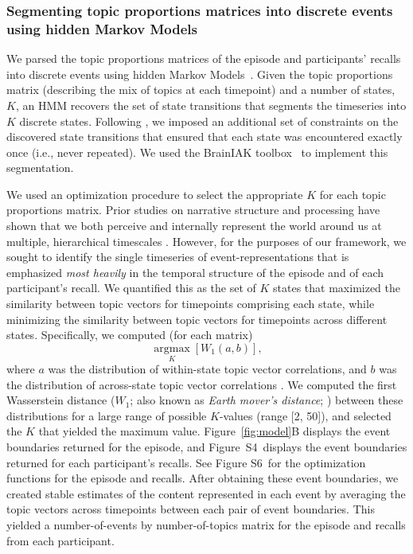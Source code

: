 \documentclass[10pt]{article}
\newcommand{\argmax}{\mathop{\mathrm{argmax}}\limits}
\newcommand{\corrmats}{S4}
\newcommand{\kopt}{S6}
\begin{document}
\subsubsection*{Segmenting topic proportions matrices into discrete events using hidden Markov Models}
We parsed the topic proportions matrices of the episode and participants' recalls into discrete events using hidden Markov Models~\citep[HMMs;][]{Rabi89}.  Given the topic proportions matrix (describing the mix of topics at each timepoint) and a number of states, $K$, an HMM recovers the set of state transitions that segments the timeseries into $K$ discrete states.  Following \cite{BaldEtal17}, we imposed an additional set of constraints on the discovered state transitions that ensured that each state was encountered exactly once (i.e., never repeated).  We used the BrainIAK toolbox~\citep{Brainiak} to implement this segmentation.

We used an optimization procedure to select the appropriate $K$ for each topic proportions matrix.  Prior studies on narrative structure and processing have shown that we both perceive and internally represent the world around us at multiple, hierarchical timescales \citep[e.g.,][]{HassEtal08, LernEtal11, HassEtal15, ChenEtal17, BaldEtal17, BaldEtal18}.  However, for the purposes of our framework, we sought to identify the single timeseries of event-representations that is emphasized \textit{most heavily} in the temporal structure of the episode and of each participant's recall.  We quantified this as the set of $K$ states that maximized the similarity between topic vectors for timepoints comprising each state, while minimizing the similarity between topic vectors for timepoints across different states.  Specifically, we computed (for each matrix)
\[
  \argmax_K \left[W_{1}(a, b)\right],
\]
where $a$ was the distribution of within-state topic vector correlations, and $b$ was the distribution of across-state topic vector correlations .  We computed the first Wasserstein distance ($W_{1}$; also known as \textit{Earth mover's distance}; \citealp{Dobr70, RamdEtal17}) between these distributions for a large range of possible $K$-values (range [2, 50]), and selected the $K$ that yielded the maximum value.  Figure~\ref{fig:model}B displays the event boundaries returned for the episode, and Figure~\corrmats~displays the event boundaries returned for each participant's recalls.  See Figure \kopt~for the optimization functions for the episode and recalls.  After obtaining these event boundaries, we created stable estimates of the content represented in each event by averaging the topic vectors across timepoints between each pair of event boundaries.  This yielded a number-of-events by number-of-topics matrix for the episode and recalls from each participant.
\end{document}
